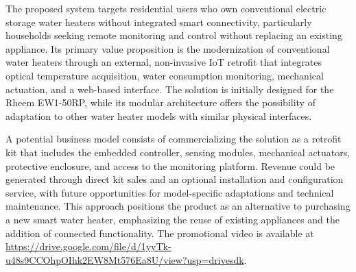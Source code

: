 The proposed system targets residential users who own conventional electric storage water heaters
without integrated smart connectivity, particularly households seeking remote monitoring and control
without replacing an existing appliance. Its primary value proposition is the modernization of
conventional water heaters through an external, non-invasive IoT retrofit that integrates optical
temperature acquisition, water consumption monitoring, mechanical actuation, and a web-based interface.
The solution is initially designed for the Rheem EW1-50RP, while its modular architecture offers the
possibility of adaptation to other water heater models with similar physical interfaces.

A potential business model consists of commercializing the solution as a retrofit kit that includes the
embedded controller, sensing modules, mechanical actuators, protective enclosure, and access to the
monitoring platform. Revenue could be generated through direct kit sales and an optional installation and
configuration service, with future opportunities for model-specific adaptations and technical maintenance.
This approach positions the product as an alternative to purchasing a new smart water heater, emphasizing
the reuse of existing appliances and the addition of connected functionality. The promotional video is
available at
\url{https://drive.google.com/file/d/1yyTk-u48s9CCOhpOIhk2EW8Mt576Ea8U/view?usp=drivesdk}.
